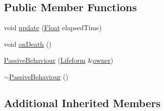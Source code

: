\subsection*{Public Member Functions}
\begin{DoxyCompactItemize}
\item 
void \hyperlink{classZeta_1_1PassiveBehaviour_aa884cb727e9de839188485eec9a5ca46}{update} (\hyperlink{namespaceZeta_a1e0a1265f9b3bd3075fb0fabd39088ba}{Float} elapsed\+Time)
\item 
void \hyperlink{classZeta_1_1PassiveBehaviour_a75e470e40f36e747eee57a1eb5f903f0}{on\+Death} ()
\item 
\hyperlink{classZeta_1_1PassiveBehaviour_a3e3c5225729ef313c1706abea2d9f8d4}{Passive\+Behaviour} (\hyperlink{classZeta_1_1Lifeform}{Lifeform} \&\hyperlink{classZeta_1_1Behaviour_ad32d56994e4e09e01ef86bcbb5c85e0a}{owner})
\item 
\hyperlink{classZeta_1_1PassiveBehaviour_ada5e5e8e0063902058494b735918ec3e}{$\sim$\+Passive\+Behaviour} ()
\end{DoxyCompactItemize}
\subsection*{Additional Inherited Members}


